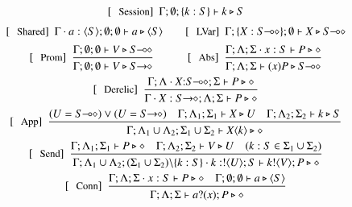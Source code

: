 \begin{figure}[!t]
\[
	\begin{array}{c}
		\trule{Session}~~\Gamma; \emptyset; \set{k:S} \proves k \hastype S 
		\\[2mm]
		\trule{Shared}~~\Gamma \cat a : \chtype{S}; \emptyset; \emptyset \proves a \hastype \chtype{S}
		\qquad
		\trule{LVar}~~\Gamma; \set{X: \lhot{S}}; \emptyset \proves X \hastype \lhot{S} 
		\\[2mm]
		\trule{Prom}~~\tree{
			\Gamma; \emptyset; \emptyset \proves V \hastype \lhot{S}
		}{
			\Gamma; \emptyset; \emptyset \proves V \hastype \shot{S}
		} 
		\qquad\quad  
				\trule{Abs}~~\tree{
			\Gamma; \Lambda; \Sigma \cat x: S \proves P \hastype \Proc
		}{
			\Gamma; \Lambda; \Sigma \proves \abs{x}{P} \hastype \lhot{S}
		}
 
		\\[4mm]

		\trule{Derelic}~~\tree{
			\Gamma; \Lambda \cat X{:}\lhot{S}; \Sigma \proves P \hastype \Proc
		}{
			\Gamma \cat X:\shot{S}; \Lambda; \Sigma \proves P \hastype \Proc
		}
		\\[4mm]

		\trule{App}~~\tree{(U = \lhot{S}) \lor (U = \shot{S}) \quad \Gamma; \Lambda_1; \Sigma_1 \proves X \hastype U  \quad \Gamma; \Lambda_2; \Sigma_2 \proves k \hastype S
		}{
			\Gamma; \Lambda_1 \cup \Lambda_2; \Sigma_1 \cup \Sigma_2 \proves \appl{X}{k} \hastype \Proc
		} 
		\\[4mm]

		\trule{Send}~~\tree{
			\Gamma; \Lambda_1; \Sigma_1 \proves P \hastype \Proc  \quad \Gamma; \Lambda_2; \Sigma_2 \vdash V \hastype U  \quad (k:S \in \Sigma_1 \cup \Sigma_2)
		}{
			\Gamma; \Lambda_1 \cup \Lambda_2; (\Sigma_1 \cup \Sigma_2)\backslash\set{k:S} \cat k:\btout{U} S \proves \bout{k}{V} P \hastype \Proc
		}

		\\[4mm]
		\trule{Conn}~~\tree{
			\Gamma; \Lambda; \Sigma \cat x:S \proves P \hastype \Proc  \quad \Gamma; \emptyset; \emptyset \proves a \hastype \chtype{S}
		}{
			\Gamma; \Lambda; \Sigma \proves \binp{a}{x} P \hastype \Proc
		}
		\\[4mm]


\end{array}\]
\end{figure}
